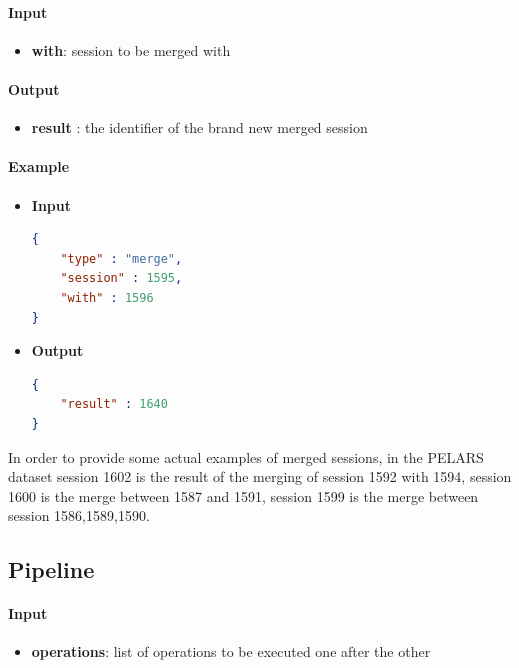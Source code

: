 \documentclass[a4paper,notitlepage,onecolumn]{hitec}  %
\begin{document}
\paragraph{Input}
\begin{itemize}
\item\textbf{with}: session to be merged with
\end{itemize}

\paragraph{Output}
\begin{itemize}
\item\textbf{result} : the identifier of the brand new merged session 
\end{itemize}

\paragraph{Example}
\begin{itemize}
\item\textbf{Input}
\begin{lstlisting}[language=json,firstnumber=1]
{
    "type" : "merge",
    "session" : 1595,
    "with" : 1596
}
\end{lstlisting}
\item\textbf{Output}
\begin{lstlisting}[language=json,firstnumber=1]
{
    "result" : 1640
}
\end{lstlisting}
\end{itemize}
In order to provide some actual examples of merged sessions, in the PELARS dataset session 1602 is the result of the merging of session 1592 with 1594, session 1600 is the merge between 1587 and 1591, session 1599 is the merge between session 1586,1589,1590. 

\subsection{Pipeline}

\paragraph{Input}
\begin{itemize}
\item\textbf{operations}: list of operations to be executed one after the other
\end{itemize}
\end{document}
